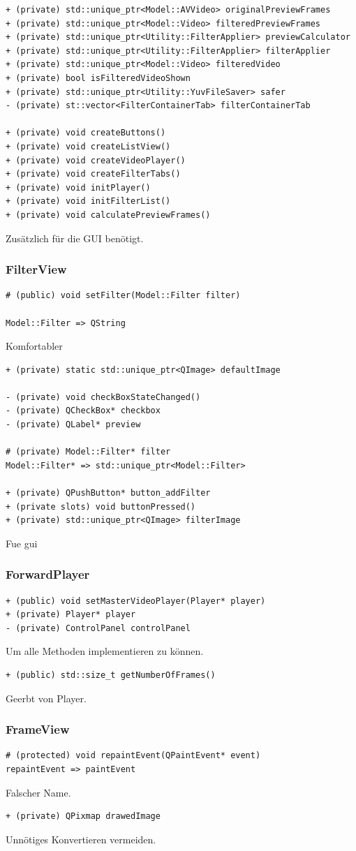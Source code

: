 \documentclass{scrartcl}
\begin{document}
{\begin{verbatim}
+ (private) std::unique_ptr<Model::AVVideo> originalPreviewFrames
+ (private) std::unique_ptr<Model::Video> filteredPreviewFrames
+ (private) std::unique_ptr<Utility::FilterApplier> previewCalculator
+ (private) std::unique_ptr<Utility::FilterApplier> filterApplier
+ (private) std::unique_ptr<Model::Video> filteredVideo
+ (private) bool isFilteredVideoShown
+ (private) std::unique_ptr<Utility::YuvFileSaver> safer
- (private) st::vector<FilterContainerTab> filterContainerTab

+ (private) void createButtons()
+ (private) void createListView()
+ (private) void createVideoPlayer()
+ (private) void createFilterTabs()
+ (private) void initPlayer()
+ (private) void initFilterList()
+ (private) void calculatePreviewFrames()
\end{verbatim}
Zusätzlich für die GUI benötigt.
\newpage
\subsubsection{FilterView}
\begin{verbatim}
# (public) void setFilter(Model::Filter filter)

Model::Filter => QString
\end{verbatim}
Komfortabler
\begin{verbatim}
+ (private) static std::unique_ptr<QImage> defaultImage

- (private) void checkBoxStateChanged()
- (private) QCheckBox* checkbox
- (private) QLabel* preview

# (private) Model::Filter* filter
Model::Filter* => std::unique_ptr<Model::Filter>

+ (private) QPushButton* button_addFilter
+ (private slots) void buttonPressed()
+ (private) std::unique_ptr<QImage> filterImage
\end{verbatim}
Fue gui
\subsubsection{ForwardPlayer}
\bigskip
\begin{verbatim}
+ (public) void setMasterVideoPlayer(Player* player)
+ (private) Player* player
- (private) ControlPanel controlPanel
\end{verbatim}
Um alle Methoden implementieren zu können.
\bigskip
\begin{verbatim}
+ (public) std::size_t getNumberOfFrames()
\end{verbatim}
Geerbt von Player.
\bigskip
\subsubsection{FrameView}
\begin{verbatim}
# (protected) void repaintEvent(QPaintEvent* event)
repaintEvent => paintEvent
\end{verbatim}
Falscher Name.
\bigskip
\begin{verbatim}
+ (private) QPixmap drawedImage
\end{verbatim}
Unnötiges Konvertieren vermeiden.
\bigskip
}
\end{document}
